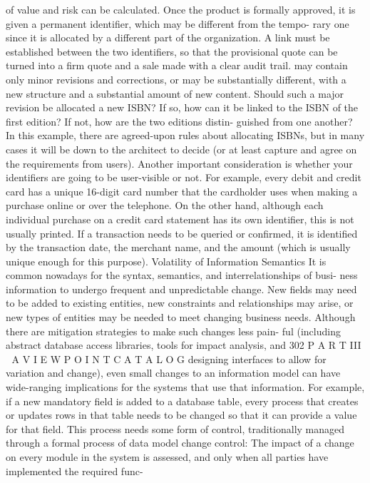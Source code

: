 of value and risk can be calculated. Once the product is formally approved,
it is given a permanent identifier, which may be different from the tempo-
rary one since it is allocated by a different part of the organization.
A link must be established between the two identifiers, so that the
provisional quote can be turned into a firm quote and a sale made with a
clear audit trail.
may contain only minor revisions and corrections, or may be substantially
different, with a new structure and a substantial amount of new content.
Should such a major revision be allocated a new ISBN? If so, how can it be
linked to the ISBN of the first edition? If not, how are the two editions distin-
guished from one another? In this example, there are agreed-upon rules
about allocating ISBNs, but in many cases it will be down to the architect to
decide (or at least capture and agree on the requirements from users).
Another important consideration is whether your identifiers are going to be
user-visible or not. For example, every debit and credit card has a unique 16-digit
card number that the cardholder uses when making a purchase online or over the
telephone. On the other hand, although each individual purchase on a credit card
statement has its own identifier, this is not usually printed. If a transaction needs
to be queried or confirmed, it is identified by the transaction date, the merchant
name, and the amount (which is usually unique enough for this purpose).
Volatility of Information Semantics
It is common nowadays for the syntax, semantics, and interrelationships of busi-
ness information to undergo frequent and unpredictable change. New fields may
need to be added to existing entities, new constraints and relationships may
arise, or new types of entities may be needed to meet changing business needs.
Although there are mitigation strategies to make such changes less pain-
ful (including abstract database access libraries, tools for impact analysis, and
302
 P A R T III  A V I E W P O I N T C A T A L O G
designing interfaces to allow for variation and change), even small changes to
an information model can have wide-ranging implications for the systems
that use that information. For example, if a new mandatory field is added to a
database table, every process that creates or updates rows in that table needs
to be changed so that it can provide a value for that field. This process needs
some form of control, traditionally managed through a formal process of data
model change control: The impact of a change on every module in the system
is assessed, and only when all parties have implemented the required func-
